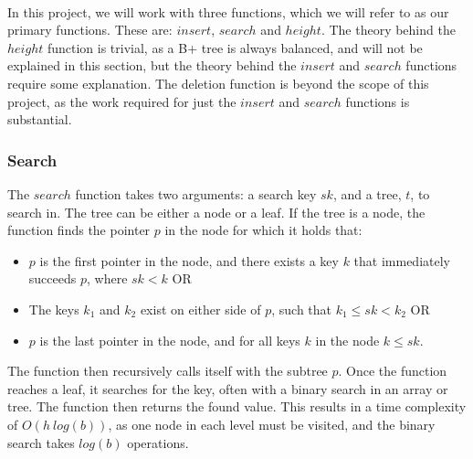 \paragraph{}
In this project, we will work with three functions, which we will refer to as our primary functions. These are: $insert$, $search$ and $height$. The theory behind the $height$ function is trivial, as a B+ tree is always balanced, and will not be explained in this section, but the theory behind the $insert$ and $search$ functions require some explanation. The deletion function is beyond the scope of this project, as the work required for just the $insert$ and $search$ functions is substantial.

\subsubsection{Search}
\label{subsec:Search}
The $search$ function takes two arguments: a search key $sk$, and a tree, $t$, to search in. The tree can be either a node or a leaf. If the tree is a node, the function finds the pointer $p$ in the node for which it holds that:
\begin{itemize}
	\item $p$ is the first pointer in the node, and there exists a key $k$ that immediately succeeds $p$, where $sk < k$ OR
	\item The keys $k_1$ and $k_2$ exist on either side of $p$, such that $k_1 \le sk < k_2$ OR
	\item $p$ is the last pointer in the node, and for all keys $k$ in the node $k \le sk$.
\end{itemize}
The function then recursively calls itself with the subtree $p$. Once the function reaches a leaf, it searches for the key, often with a binary search in an array or tree. The function then returns the found value. This results in a time complexity of $O(h~log(b))$, as one node in each level must be visited, and the binary search takes $log(b)$ operations.


